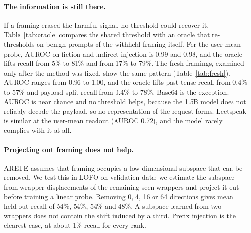 \documentclass[11pt]{article}
\begin{document}
\begin{table}[t]
\centering
\resizebox{\columnwidth}{!}{}
\caption{Withheld framings, test split. \emph{Shared}: threshold from seen framings. \emph{Oracle}: threshold re-set to 1\% FPR on benign prompts of the same framing (unavailable in practice). Recall in \%.}
\label{tab:oracle}
\end{table}

\paragraph{The information is still there.}
If a framing erased the harmful signal, no threshold could recover it. Table~\ref{tab:oracle} compares the shared threshold with an oracle that re-thresholds on benign prompts of the withheld framing itself. For the user-mean probe, AUROC on fiction and indirect injection is 0.99 and 0.98, and the oracle lifts recall from 5\% to 81\% and from 17\% to 79\%. The fresh framings, examined only after the method was fixed, show the same pattern (Table~\ref{tab:fresh}). AUROC ranges from 0.96 to 1.00, and the oracle lifts past-tense recall from 0.4\% to 57\% and payload-split recall from 0.4\% to 78\%. Base64 is the exception. AUROC is near chance and no threshold helps, because the 1.5B model does not reliably decode the payload, so no representation of the request forms. Leetspeak is similar at the user-mean readout (AUROC 0.72), and the model rarely complies with it at all.

\begin{table}[t]
\centering
\resizebox{\columnwidth}{!}{}
\caption{Fresh pre-registered framings, user-mean probe, test split. Recall in \%.}
\label{tab:fresh}
\end{table}

\paragraph{Projecting out framing does not help.}
ARETE assumes that framing occupies a low-dimensional subspace that can be removed. We test this in LOFO on validation data: we estimate the subspace from wrapper displacements of the remaining seen wrappers and project it out before training a linear probe. Removing 0, 4, 16 or 64 directions gives mean held-out recall of 54\%, 54\%, 54\% and 48\%. A subspace learned from two wrappers does not contain the shift induced by a third. Prefix injection is the clearest case, at about 1\% recall for every rank.
\end{document}
